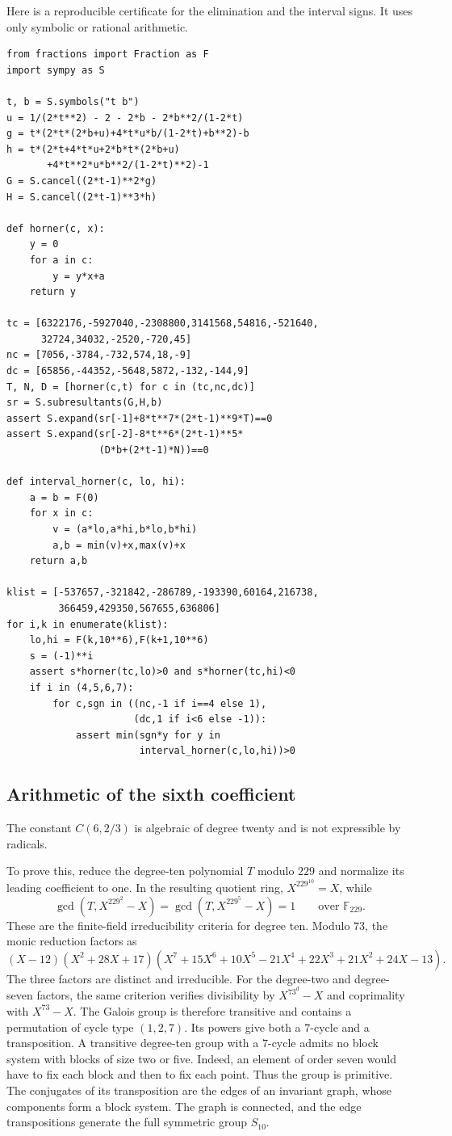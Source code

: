 \documentclass[11pt]{article}
\begin{document}
Here is a reproducible certificate for the elimination and the
interval signs. It uses only symbolic or rational arithmetic.
\begin{verbatim}
from fractions import Fraction as F
import sympy as S

t, b = S.symbols("t b")
u = 1/(2*t**2) - 2 - 2*b - 2*b**2/(1-2*t)
g = t*(2*t*(2*b+u)+4*t*u*b/(1-2*t)+b**2)-b
h = t*(2*t+4*t*u+2*b*t*(2*b+u)
       +4*t**2*u*b**2/(1-2*t)**2)-1
G = S.cancel((2*t-1)**2*g)
H = S.cancel((2*t-1)**3*h)

def horner(c, x):
    y = 0
    for a in c:
        y = y*x+a
    return y

tc = [6322176,-5927040,-2308800,3141568,54816,-521640,
      32724,34032,-2520,-720,45]
nc = [7056,-3784,-732,574,18,-9]
dc = [65856,-44352,-5648,5872,-132,-144,9]
T, N, D = [horner(c,t) for c in (tc,nc,dc)]
sr = S.subresultants(G,H,b)
assert S.expand(sr[-1]+8*t**7*(2*t-1)**9*T)==0
assert S.expand(sr[-2]-8*t**6*(2*t-1)**5*
                (D*b+(2*t-1)*N))==0

def interval_horner(c, lo, hi):
    a = b = F(0)
    for x in c:
        v = (a*lo,a*hi,b*lo,b*hi)
        a,b = min(v)+x,max(v)+x
    return a,b

klist = [-537657,-321842,-286789,-193390,60164,216738,
         366459,429350,567655,636806]
for i,k in enumerate(klist):
    lo,hi = F(k,10**6),F(k+1,10**6)
    s = (-1)**i
    assert s*horner(tc,lo)>0 and s*horner(tc,hi)<0
    if i in (4,5,6,7):
        for c,sgn in ((nc,-1 if i==4 else 1),
                      (dc,1 if i<6 else -1)):
            assert min(sgn*y for y in
                       interval_horner(c,lo,hi))>0
\end{verbatim}


\subsection{Arithmetic of the sixth coefficient}
The constant \(C(6,2/3)\) is algebraic of degree twenty and
is not expressible by radicals.

To prove this, reduce the degree-ten polynomial \(T\) modulo
\(229\) and normalize its leading coefficient to one.
In the resulting quotient ring, \(X^{229^{10}}=X\), while
\[
 \gcd(T,X^{229^2}-X)=\gcd(T,X^{229^5}-X)=1
 \qquad\text{over }\mathbb F_{229}.
\]
These are the finite-field irreducibility criteria for degree ten.
Modulo \(73\), the monic reduction factors as
\[
 (X-12)(X^2+28X+17)
 (X^7+15X^6+10X^5-21X^4+22X^3+21X^2+24X-13).
\]
The three factors are distinct and irreducible. For the degree-two
and degree-seven factors, the same criterion verifies divisibility
by \(X^{73^d}-X\) and coprimality with \(X^{73}-X\).
The Galois group is therefore transitive and contains a
permutation of cycle type \((1,2,7)\). Its powers give both a
\(7\)-cycle and a transposition. A transitive degree-ten group
with a \(7\)-cycle admits no block system with blocks of size
two or five. Indeed, an element of order seven would have to
fix each block and then to fix each point. Thus the group is
primitive. The conjugates of its transposition are the edges of
an invariant graph, whose components form a block system. The
graph is connected, and the edge transpositions generate the
full symmetric group \(S_{10}\).
\end{document}

